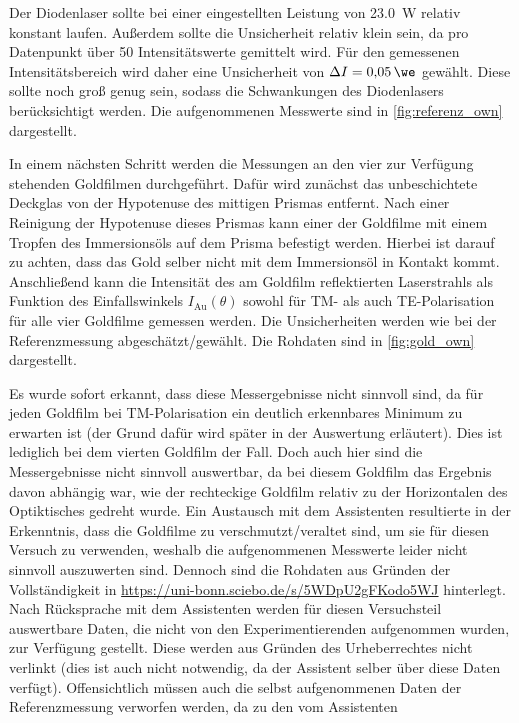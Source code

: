 Der Diodenlaser sollte bei einer eingestellten Leistung von \SI{23,0}{\watt} relativ konstant laufen. Außerdem sollte die Unsicherheit relativ klein sein, da pro
Datenpunkt über 50 Intensitätswerte gemittelt wird. Für den gemessenen Intensitätsbereich wird daher eine Unsicherheit von $\Delta I = \SI{0,05}{\we}$ gewählt. Diese
sollte noch groß genug sein, sodass die Schwankungen des Diodenlasers berücksichtigt werden. Die aufgenommenen Messwerte sind in \cref{fig:referenz_own} dargestellt.\par
In einem nächsten Schritt werden die Messungen an den vier zur Verfügung stehenden Goldfilmen durchgeführt. Dafür wird zunächst das unbeschichtete Deckglas
von der Hypotenuse des mittigen Prismas entfernt. Nach einer Reinigung der Hypotenuse dieses Prismas kann einer der Goldfilme mit einem Tropfen des Immersionsöls auf
dem Prisma befestigt werden. Hierbei ist darauf zu achten, dass das Gold selber nicht mit dem Immersionsöl in Kontakt kommt. Anschließend kann die Intensität des am
Goldfilm reflektierten Laserstrahls als Funktion des Einfallswinkels $I_{\mathrm{Au}}(\theta)$ sowohl für TM- als auch TE-Polarisation für alle vier Goldfilme gemessen werden. Die Unsicherheiten
werden wie bei der Referenzmessung abgeschätzt/gewählt. Die Rohdaten sind in \cref{fig:gold_own} dargestellt.\par
Es wurde sofort erkannt, dass diese Messergebnisse nicht sinnvoll sind,
da für jeden Goldfilm bei TM-Polarisation ein deutlich erkennbares Minimum zu erwarten ist (der Grund dafür wird später in der Auswertung erläutert). Dies ist lediglich
bei dem vierten Goldfilm der Fall. Doch auch hier sind die Messergebnisse nicht sinnvoll auswertbar, da bei diesem Goldfilm das Ergebnis davon abhängig war, wie der
rechteckige Goldfilm relativ zu der Horizontalen des Optiktisches gedreht wurde. Ein Austausch mit dem Assistenten resultierte in der Erkenntnis, dass die Goldfilme zu
verschmutzt/veraltet sind, um sie für diesen Versuch zu verwenden, weshalb die aufgenommenen Messwerte leider nicht sinnvoll auszuwerten sind. Dennoch sind die Rohdaten
aus Gründen der Vollständigkeit in \url{https://uni-bonn.sciebo.de/s/5WDpU2gFKodo5WJ} hinterlegt. Nach Rücksprache mit dem Assistenten werden für diesen Versuchsteil auswertbare Daten, die nicht von den
Experimentierenden aufgenommen wurden, zur Verfügung gestellt. Diese werden aus Gründen des Urheberrechtes nicht verlinkt (dies ist auch nicht notwendig, da
der Assistent selber über diese Daten verfügt). Offensichtlich müssen auch die selbst aufgenommenen Daten der Referenzmessung verworfen werden, da zu den vom Assistenten
